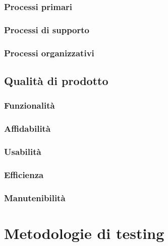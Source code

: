 \documentclass[italian,12pt]{article} %
\begin{document}
\subsubsection{Processi primari}



\subsubsection{Processi di supporto}




\subsubsection{Processi organizzativi}


\subsection{Qualità di prodotto}

\subsubsection{Funzionalità}

\subsubsection{Affidabilità}

\subsubsection{Usabilità}

\subsubsection{Efficienza}

\subsubsection{Manutenibilità}

\section{Metodologie di testing}
\end{document}
